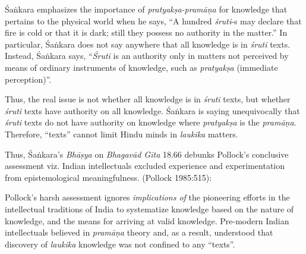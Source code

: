 Śaṅkara emphasizes the importance of {\sl pratyakṣa-pramāṇa} for knowledge that pertains to the physical world when he says, ``A hundred {\sl śruti}-s may declare that fire is cold or that it is dark; still they possess no authority in the matter.''  In particular, Śaṅkara does not say anywhere that all knowledge is in {\sl śruti} texts. Instead, Śaṅkara says, ``{\sl Śruti} is an authority only in matters not perceived by means of ordinary instruments of knowledge, such as {\sl pratyakṣa} (immediate perception)''. 

Thus, the real issue is not whether all knowledge is in {\sl śruti} texts, but whether {\sl śruti} texts have authority on all knowledge.  Śaṅkara is saying unequivocally that {\sl śruti} texts do not have authority on knowledge where {\sl pratyakṣa} is the {\sl pramāṇa}. Therefore, ``texts'' cannot limit Hindu minds in {\sl laukika} matters.

Thus, Śaṅkara's {\sl Bhāṣya} on {\sl Bhagavād Gīta} 18.66 debunks Pollock's conclusive assessment viz. Indian intellectuals excluded experience and experimentation from epistemological meaningfulness. (Pollock 1985:515):

Pollock's harsh assessment ignores {\sl implications of} the pioneering efforts in the intellectual traditions of India to systematize knowledge based on the nature of knowledge, and the means for arriving at valid knowledge.  Pre-modern Indian intellectuals believed in {\sl pramāṇa} theory and, as a result, understood that discovery of {\sl laukika} knowledge was not confined to any ``texts''. 

